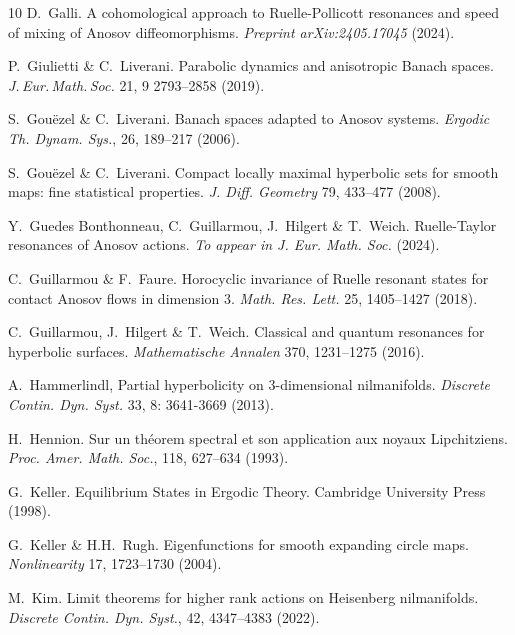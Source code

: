 \documentclass[a4paper,11pt]{amsart}
\theoremstyle{remark}
\begin{document}
\begin{thebibliography}{10}
    D.~Galli. 
    A cohomological approach to Ruelle-Pollicott resonances and speed of mixing of Anosov diffeomorphisms.
    \emph{Preprint arXiv:2405.17045} (2024).
    
    P.~Giulietti \& C.~Liverani.
    Parabolic dynamics and anisotropic Banach spaces.
    \emph{J.\,Eur.\,Math.\,Soc.} 21, 9 2793--2858 (2019).

    S.~Gouëzel \& C.~Liverani.
    Banach spaces adapted to Anosov systems.
    \emph{Ergodic Th. Dynam. Sys.}, 26, 189--217 (2006).

    S.~Gouëzel \& C.~Liverani.
    Compact locally maximal hyperbolic sets for smooth maps: fine statistical properties.
    \emph{J. Diff. Geometry} 79, 433--477 (2008).

    Y.~Guedes Bonthonneau, C.~Guillarmou, J.~Hilgert \& T.~Weich.
    Ruelle-Taylor resonances of Anosov actions.
    \emph{To appear in J. Eur. Math. Soc.} (2024).


    C.~Guillarmou \& F.~Faure.
    Horocyclic invariance of Ruelle resonant states for contact Anosov flows in dimension 3.
    \emph{Math. Res. Lett.} 25, 1405--1427 (2018).

    C.~Guillarmou, J.~Hilgert \& T.~Weich.
    Classical and quantum resonances for hyperbolic surfaces.
    \emph{Mathematische Annalen} 370, 1231--1275 (2016).

    A.~Hammerlindl,
    Partial hyperbolicity on 3-dimensional nilmanifolds.
    \emph{Discrete Contin. Dyn. Syst.} 33, 8: 3641-3669 (2013).

    H.~Hennion.
    Sur un théorem spectral et son application aux noyaux Lipchitziens.
    \emph{Proc. Amer. Math. Soc.}, 118, 627--634 (1993).

    G.~Keller.
    Equilibrium States in Ergodic Theory. Cambridge University Press (1998).
  
    G.~Keller \& H.H.~Rugh.
    {Eigenfunctions for smooth expanding circle maps.}
    \emph{Nonlinearity} 17, 1723--1730 (2004).

    M.~Kim.
    Limit theorems for higher rank actions on Heisenberg nilmanifolds.
    \emph{Discrete Contin. Dyn. Syst.}, 42, 4347--4383 (2022).


\end{thebibliography}
\end{document}
